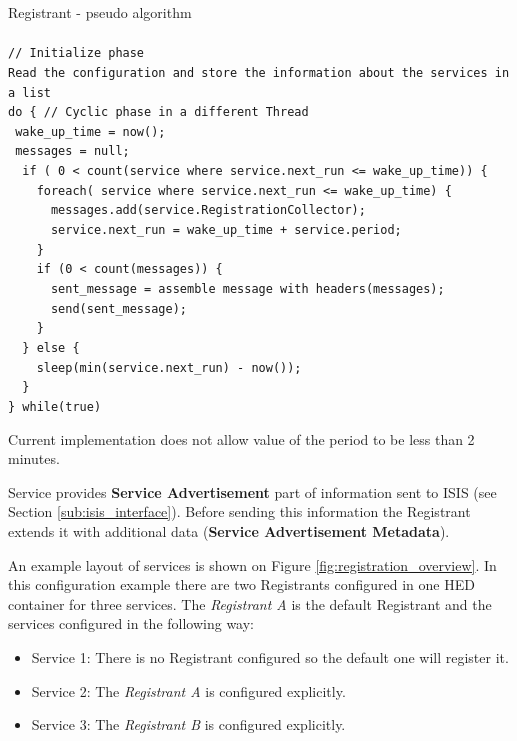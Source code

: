 \documentclass{book}
\begin{document}
\begin{framed}
  Registrant - pseudo algorithm\\
  \\
  \verb#// Initialize phase#\\
  \verb#Read the configuration and store the information about the services in a list#\\
  \verb#do { // Cyclic phase in a different Thread#\\
  \verb# wake_up_time = now();#\\
  \verb# messages = null;#\\
  \verb#  if ( 0 < count(service where service.next_run <= wake_up_time)) {#\\
  \verb#    foreach( service where service.next_run <= wake_up_time) {#\\
  \verb#      messages.add(service.RegistrationCollector);#\\
  \verb#      service.next_run = wake_up_time + service.period;#\\
  \verb#    }#\\
  \verb#    if (0 < count(messages)) {#\\
  \verb#      sent_message = assemble message with headers(messages);#\\
  \verb#      send(sent_message);#\\
  \verb#    }#\\
  \verb#  } else {#\\
  \verb#    sleep(min(service.next_run) - now()); #\\
  \verb#  }#\\
  \verb#} while(true)#\\
\end{framed}
Current implementation does not allow value of the period to be less than 2 minutes.

Service provides \textbf{Service Advertisement} part of information sent to ISIS (see Section \ref{sub:isis_interface}).
Before sending this information the Registrant extends it with additional data (\textbf{Service Advertisement Metadata}).

An example layout of services is shown on Figure \ref{fig:registration_overview}. In this configuration example 
there are two Registrants configured in one HED container for three services. The \textit{Registrant A} is the 
default Registrant and the services configured in the following way:

\begin{itemize}
  \item Service 1: There is no Registrant configured so the default one will register it.
  \item Service 2: The \textit{Registrant A} is configured explicitly.
  \item Service 3: The \textit{Registrant B} is configured explicitly.
\end{itemize}
\end{document}
